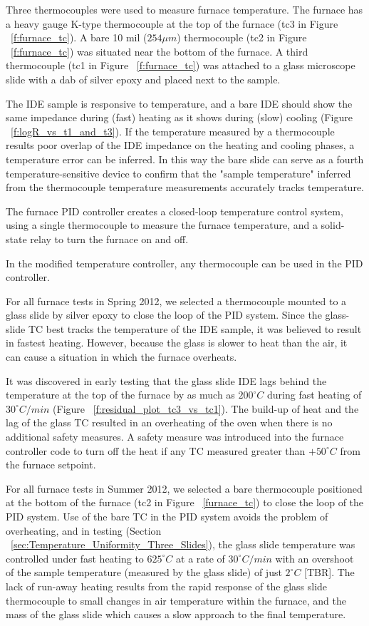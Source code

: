 \documentclass[12pt,oneside,english]{article}
\begin{document}
	Three thermocouples were used to measure furnace temperature.  
	The furnace has a heavy gauge K-type thermocouple at the top of the furnace (tc3 in Figure ~\ref{f:furnace_tc}).  
	A bare 10 mil ($254{\mu}m$) thermocouple (tc2 in Figure ~\ref{f:furnace_tc}) was situated near the bottom of the furnace.  
	A third thermocouple (tc1 in Figure ~\ref{f:furnace_tc}) was attached to a glass microscope slide with a dab of silver epoxy and placed next to the sample.
	
	The IDE sample is responsive to temperature, and a bare IDE should show the same impedance during (fast) heating as it shows during (slow) cooling (Figure ~\ref{f:logR_vs_t1_and_t3}).  
	If the temperature measured by a thermocouple results poor overlap of the IDE impedance on the heating and cooling phases, a temperature error can be inferred.
	In this way the bare slide can serve as a fourth temperature-sensitive device to confirm that the "sample temperature" inferred from the thermocouple temperature measurements accurately tracks temperature.  
	
	The furnace PID controller creates a closed-loop temperature control system, using a single thermocouple to measure the furnace temperature, and a solid-state relay to turn the furnace on and off. 

	In the modified temperature controller, any thermocouple can be used in the PID controller.	
	
	For all furnace tests in Spring 2012, we selected a thermocouple mounted to a glass slide by silver epoxy to close the loop of the PID system.
	Since the glass-slide TC best tracks the temperature of the IDE sample, it was believed to result in fastest heating.
	However, because the glass is slower to heat than the air, it can cause a situation in which the furnace overheats. 
	
	It was discovered in early testing that the glass slide IDE lags behind the temperature at the top of the furnace by as much as $200^{\circ}C$ during fast heating of $30^{\circ}C/min$ (Figure ~\ref{f:residual_plot_tc3_vs_tc1}).  
	The build-up of heat and the lag of the glass TC resulted in an overheating of the oven when there is no additional safety measures.  
	A safety measure was introduced into the furnace controller code to turn off the heat if any TC measured greater than $+50^{\circ}C$ from the furnace setpoint.

	For all furnace tests in Summer 2012, we selected a bare thermocouple positioned at the bottom of the furnace (tc2 in Figure ~\ref{furnace_tc}) to close the loop of the PID system.
	Use of the bare TC in the PID system avoids the problem of overheating, and in testing (Section ~\ref{sec:Temperature_Uniformity_Three_Slides}), the glass slide temperature was controlled under fast heating to $625^{\circ}C$ at a rate of $30^{\circ}C/min$ with an overshoot of the sample temperature (measured by the glass slide) of just $2^{\circ}C$  [TBR].  
	The lack of run-away heating results from the rapid response of the glass slide thermocouple to small changes in air temperature within the furnace, and the mass of the glass slide which causes a slow approach to the final temperature.
\end{document}
